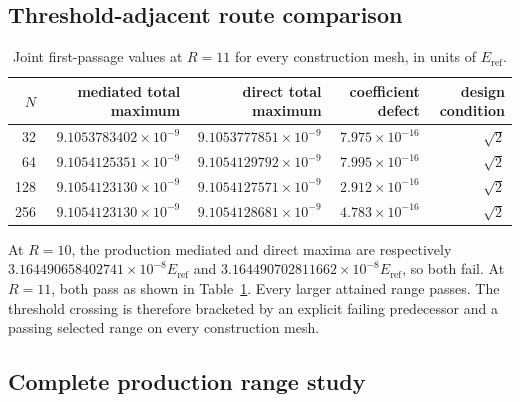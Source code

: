 \documentclass[11pt]{article}
\newcommand{\eref}{E_{\mathrm{ref}}}
\begin{document}
\subsection{Threshold-adjacent route comparison}

\begin{table}[htbp]
\centering
\caption{Joint first-passage values at $R=11$ for every construction mesh, in units of
$\eref$.}
\label{tab:first-pass}
\begin{tabular}{rrrrr}
\toprule
$N$ & mediated total maximum & direct total maximum & coefficient defect & design condition \\
\midrule
32  & $9.1053783402\times10^{-9}$ & $9.1053777851\times10^{-9}$ & $7.975\times10^{-16}$ & $\sqrt2$ \\
64  & $9.1054125351\times10^{-9}$ & $9.1054129792\times10^{-9}$ & $7.995\times10^{-16}$ & $\sqrt2$ \\
128 & $9.1054123130\times10^{-9}$ & $9.1054127571\times10^{-9}$ & $2.912\times10^{-16}$ & $\sqrt2$ \\
256 & $9.1054123130\times10^{-9}$ & $9.1054128681\times10^{-9}$ & $4.783\times10^{-16}$ & $\sqrt2$ \\
\bottomrule
\end{tabular}
\end{table}

At $R=10$, the production mediated and direct maxima are respectively
$3.164490658402741\times10^{-8}\eref$ and
$3.164490702811662\times10^{-8}\eref$, so both fail.  At $R=11$, both pass as shown in
Table~\ref{tab:first-pass}.  Every larger attained range passes.  The threshold crossing
is therefore bracketed by an explicit failing predecessor and a passing selected range
on every construction mesh.

\subsection{Complete production range study}
\end{document}
